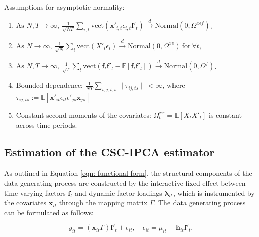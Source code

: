 \documentclass[12pt]{article}
\begin{document}
\begin{assumption}
Assumptions for asymptotic normality:
\begin{enumerate}
    \item $\text{As } N, T \to \infty, \: \frac{1}{\sqrt{NT}} \sum_{i,t} \text{vect}\left( \bm{x}'_{i,t} \epsilon_{i,t} \bm{f}'_{t} \right) \xrightarrow{d} \text{Normal} \left(0, \Omega^{x\epsilon f} \right)$,
    
    \item $\text{As } N \to \infty, \: \frac{1}{\sqrt{N}} \sum_{i} \text{vect}\left( X'_{i} \epsilon_{i} \right) \xrightarrow{d} \text{Normal} \left(0, \Omega^{x\epsilon} \right) \: \text{for} \: \forall t$,
    
    \item $\text{As } N, T \to \infty, \: \frac{1}{\sqrt{T}} \sum_{t} \text{vect}\left( \bm{f}_{t}\bm{f}'_{t} - \mathbb{E}[\bm{f}_{t}\bm{f}'_{t}] \right) \xrightarrow{d} \text{Normal} \left(0, \Omega^{f} \right)$.
    
    \item Bounded dependence: $\frac{1}{NT} \sum_{i,j,t,s}\|\tau_{ij, ts}\| < \infty$, where $\tau_{ij, ts} := \mathbb{E} \left[ \bm{x}'_{it} \epsilon_{it} \epsilon'_{js} \bm{x}_{js} \right]$
    
    \item Constant second moments of the covariates: $\Omega_t^{xx} = \mathbb{E}\left[ X_{t} X'_{t} \right]$ is constant across time periods.
    \end{enumerate}
    \label{app: ass normality}
\end{assumption}

\subsection{Estimation of the CSC-IPCA estimator}
\label{sec: appendix estimation}

As outlined in Equation \ref{eqn: functional form}, the structural components of the data generating process are constructed by the interactive fixed effect between time-varying factors $\bm{f}_t$ and dynamic factor loadings $\bm{\lambda}_{it}$, which is instrumented by the covariates $\bm{x}_{it}$ through the mapping matrix $\Gamma$. The data generating process can be formulated as follows:

\begin{equation}
\label{app: eqn combined}
y_{it} = (\bm{x}_{it}\Gamma) \bm{f}'_{t} + \epsilon_{it}, \quad \epsilon_{it} = \mu_{it} + \bm{h}_{it} \bm{f}'_t.
\end{equation}
\end{document}
